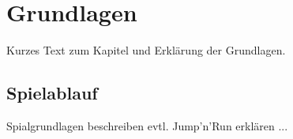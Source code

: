 \chapter{Grundlagen}
\label{cha:grundlagen}
Kurzes Text zum Kapitel und Erklärung der Grundlagen.

\section{Spielablauf}
\label{sec:grundlagen:spielablauf}
Spialgrundlagen beschreiben
evtl. Jump'n'Run erklären
...